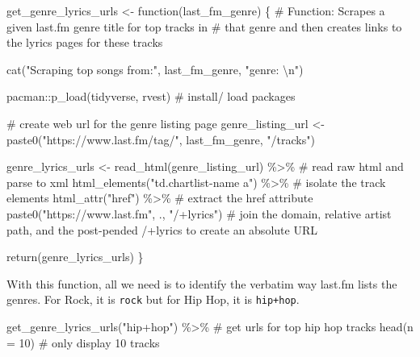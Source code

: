 \documentclass[
  letterpaper,
]{latex/krantz}
\newenvironment{Shaded}{\begin{snugshade}}{\end{snugshade}}
\newcommand{\AttributeTok}[1]{\textcolor[rgb]{0.40,0.45,0.13}{#1}}
\newcommand{\CommentTok}[1]{\textcolor[rgb]{0.37,0.37,0.37}{#1}}
\newcommand{\ControlFlowTok}[1]{\textcolor[rgb]{0.00,0.23,0.31}{#1}}
\newcommand{\DecValTok}[1]{\textcolor[rgb]{0.68,0.00,0.00}{#1}}
\newcommand{\FunctionTok}[1]{\textcolor[rgb]{0.28,0.35,0.67}{#1}}
\newcommand{\NormalTok}[1]{\textcolor[rgb]{0.00,0.23,0.31}{#1}}
\newcommand{\OtherTok}[1]{\textcolor[rgb]{0.00,0.23,0.31}{#1}}
\newcommand{\SpecialCharTok}[1]{\textcolor[rgb]{0.37,0.37,0.37}{#1}}
\newcommand{\StringTok}[1]{\textcolor[rgb]{0.13,0.47,0.30}{#1}}
\begin{document}
\begin{Shaded}
\begin{Highlighting}[]
\NormalTok{get\_genre\_lyrics\_urls }\OtherTok{\textless{}{-}} \ControlFlowTok{function}\NormalTok{(last\_fm\_genre) \{}
  \CommentTok{\# Function: Scrapes a given last.fm genre title for top tracks in}
  \CommentTok{\# that genre and then creates links to the lyrics pages for these tracks}
  
  \FunctionTok{cat}\NormalTok{(}\StringTok{"Scraping top songs from:"}\NormalTok{, last\_fm\_genre, }\StringTok{"genre: }\SpecialCharTok{\textbackslash{}n}\StringTok{"}\NormalTok{)}
  
\NormalTok{  pacman}\SpecialCharTok{::}\FunctionTok{p\_load}\NormalTok{(tidyverse, rvest) }\CommentTok{\# install/ load packages}
  
  \CommentTok{\# create web url for the genre listing page}
\NormalTok{  genre\_listing\_url }\OtherTok{\textless{}{-}} 
    \FunctionTok{paste0}\NormalTok{(}\StringTok{"https://www.last.fm/tag/"}\NormalTok{, last\_fm\_genre, }\StringTok{"/tracks"}\NormalTok{) }
  
\NormalTok{  genre\_lyrics\_urls }\OtherTok{\textless{}{-}} 
    \FunctionTok{read\_html}\NormalTok{(genre\_listing\_url) }\SpecialCharTok{\%\textgreater{}\%} \CommentTok{\# read raw html and parse to xml}
    \FunctionTok{html\_elements}\NormalTok{(}\StringTok{"td.chartlist{-}name a"}\NormalTok{) }\SpecialCharTok{\%\textgreater{}\%} \CommentTok{\# isolate the track elements}
    \FunctionTok{html\_attr}\NormalTok{(}\StringTok{"href"}\NormalTok{) }\SpecialCharTok{\%\textgreater{}\%} \CommentTok{\# extract the href attribute}
    \FunctionTok{paste0}\NormalTok{(}\StringTok{"https://www.last.fm"}\NormalTok{, ., }\StringTok{"/+lyrics"}\NormalTok{) }\CommentTok{\# join the domain, relative artist path, and the post{-}pended /+lyrics to create an absolute URL}
  
  \FunctionTok{return}\NormalTok{(genre\_lyrics\_urls)}
\NormalTok{\}}
\end{Highlighting}
\end{Shaded}

With this function, all we need is to identify the verbatim way last.fm
lists the genres. For Rock, it is \texttt{rock} but for Hip Hop, it is
\texttt{hip+hop}.

\begin{Shaded}
\begin{Highlighting}[]
\FunctionTok{get\_genre\_lyrics\_urls}\NormalTok{(}\StringTok{"hip+hop"}\NormalTok{) }\SpecialCharTok{\%\textgreater{}\%}  \CommentTok{\# get urls for top hip hop tracks}
  \FunctionTok{head}\NormalTok{(}\AttributeTok{n =} \DecValTok{10}\NormalTok{) }\CommentTok{\# only display 10 tracks}
\end{Highlighting}
\end{Shaded}
\end{document}

